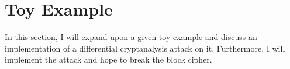



\chapter{Toy Example} \label{c:toy example}

In this section, I will expand upon a given toy example and discuss
an implementation of a differential cryptanalysis attack on it.
Furthermore, I will implement the attack and hope to break the
block cipher.
